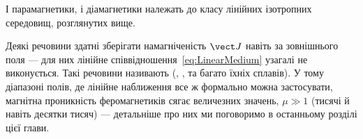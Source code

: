 І парамагнетики, і діамагнетики належать до класу лінійних ізотропних
середовищ, розглянутих вище.

Деякі речовини здатні зберігати намагніченість $\vect J$ навіть за
 зовнішнього поля --- для них лінійне
співвідношення~\eqref{eq:LinearMedium} узагалі не виконується. Такі
речовини називають  (, ,  та
багато їхніх сплавів). У тому діапазоні полів, де лінійне наближення все ж
формально можна застосувати, магнітна проникність феромагнетиків сягає
величезних значень, $\mu \gg 1$ (тисячі й навіть десятки тисяч) ---
детальніше про них ми поговоримо в останньому розділі цієї глави.






